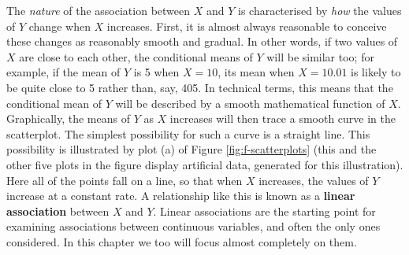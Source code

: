 \documentclass[11pt,a4paper,openany]{book}
\begin{document}
The \emph{nature} of the association between \(X\) and \(Y\) is
characterised by \emph{how} the values of \(Y\) change when \(X\)
increases. First, it is almost always reasonable to conceive these
changes as reasonably smooth and gradual. In other words, if two values
of \(X\) are close to each other, the conditional means of \(Y\) will be
similar too; for example, if the mean of \(Y\) is 5 when \(X=10\), its
mean when \(X=10.01\) is likely to be quite close to 5 rather than, say,
405. In technical terms, this means that the conditional mean of \(Y\)
will be described by a smooth mathematical function of \(X\).
Graphically, the means of \(Y\) as \(X\) increases will then trace a
smooth curve in the scatterplot. The simplest possibility for such a
curve is a straight line. This possibility is illustrated by plot (a) of
Figure \ref{fig:f-scatterplots} (this and the other five plots in the
figure display artificial data, generated for this illustration). Here
all of the points fall on a line, so that when \(X\) increases, the
values of \(Y\) increase at a constant rate. A relationship like this is
known as a \textbf{linear association} between \(X\) and \(Y\). Linear
associations are the starting point for examining associations between
continuous variables, and often the only ones considered. In this
chapter we too will focus almost completely on them.
\end{document}
